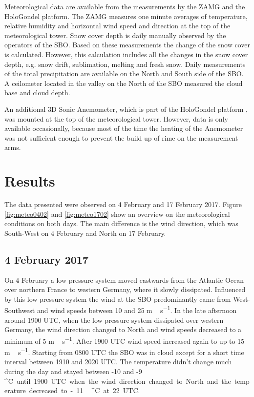 \documentclass[draft,linenumbers]{agujournal}
\begin{document}

Meteorological data are available from the measurements by the ZAMG and the HoloGondel platform. The ZAMG measures one minute averages of temperature, relative humidity and horizontal wind speed and direction at the top of the meteorological tower. Snow cover depth is daily manually observed by the operators of the SBO. Based on these measurements the change of the snow cover is calculated. However, this calculation includes all the changes in the snow cover depth, e.g. snow drift, sublimation, melting and fresh snow. Daily measurements of the total precipitation are available on the North and South side of the SBO. A ceilometer located in the valley on the North of the SBO measured the cloud base and cloud depth. 

An additional 3D Sonic Anemometer, which is part of the HoloGondel platform \citep{Bec17}, was mounted at the top of the meteorological tower. However, data is only available occasionally, because most of the time the heating of the Anemometer was not sufficient enough to prevent the build up of rime on the measurement arms. 

\section{Results}
\label{Results}

The data presented were observed on 4 February and 17 February 2017. Figure \ref{fig:meteo0402} and \ref{fig:meteo1702} show an overview on the meteorological conditions on both days. The main difference is the wind direction, which was South-West on 4 February and North on 17 February. 

\subsection{4 February 2017}

On 4 February a low pressure system moved eastwards from the Atlantic Ocean over northern France to western Germany, where it slowly dissipated. Influenced by this low pressure system the wind at the SBO predominantly came from West-Southwest and wind speeds between 10 and 25 \si{m\,s^{-1}}. In the late afternoon around 1900 UTC, when the low pressure system dissipated over western Germany, the wind direction changed to North and wind speeds decreased to a minimum of 5 \si{m\,s^{-1}}. After 1900 UTC wind speed increased again to up to 15 \si{m\,s^{-1}}. Starting from 0800 UTC the SBO was in cloud except for a short time interval between 1910 and 2020 UTC. 
The temperature didn't change much during the day and stayed between -10 and -9\,\si{^\circ C} until 1900 UTC when the wind direction changed to North and the temperature decreased to -11\,\si{^\circ C} at 22 UTC.
\end{document}
